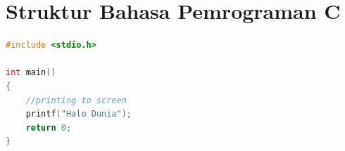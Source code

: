%			
%			
%			
\section{Struktur Bahasa Pemrograman C}

\begin{lstlisting}[language=c,caption=Contoh program sederhana dalam bahasa C,label=lst:helloworld,captionpos=t]
#include <stdio.h>

int main()
{
	//printing to screen
	printf("Halo Dunia");
	return 0;
}
\end{lstlisting}


